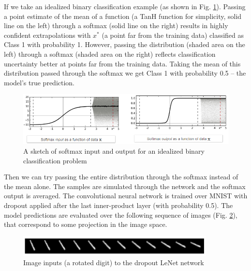 If we take an idealized binary classification example (as shown in Fig. \ref{fig:classification_binary}). Passing a point estimate of the mean of a function (a TanH function for simplicity, solid line on the left) through a softmax (solid line on the right) results in highly confident extrapolations with $x^*$ (a point far from the training data) classified as Class 1 with probability 1. However, passing the distribution (shaded area on the left) through a softmax (shaded area on the right) reflects classification uncertainty better at points far from the training data. Taking the mean of this distribution passed through the softmax we get Class 1 with probability 0.5 -- the model's true prediction.

\begin{figure}[H]
    \centering
    \includegraphics[width=\textwidth]{labs/12/images/Classification_binary.png}
    \caption{A sketch of softmax input and output for an idealized binary classification problem}
    \label{fig:classification_binary}
\end{figure}

Then we can try passing the entire distribution through the softmax instead of the mean alone. The samples are simulated through the network and the softmax output is averaged. The convolutional neural network is trained over MNIST with dropout applied after the last inner-product layer (with probability 0.5). The model predictions are evaluated over the following sequence of images (Fig. \ref{fig:classification_input}), that correspond to some projection in the image space.

\begin{figure}[H]
    \centering
    \includegraphics[width=10cm]{labs/12/images/Classification_input.png}
    \caption{Image inputs (a rotated digit) to the dropout LeNet network}
    \label{fig:classification_input}
\end{figure}

